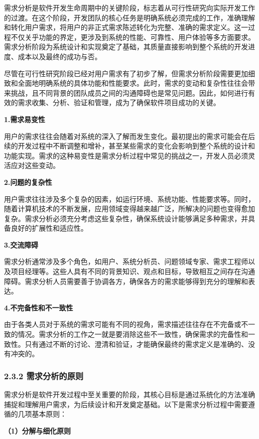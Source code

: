 需求分析是软件开发生命周期中的关键阶段，标志着从可行性研究向实际开发工作的过渡。在这个阶段，开发团队的核心任务是明确系统必须完成的工作，准确理解和转化用户需求，将用户的非正式需求陈述转化为完整、准确的需求定义。这一过程不仅关乎功能的界定，更涉及到系统的性能、可靠性、用户体验等多方面要求。需求分析阶段为系统设计和实现奠定了基础，其质量直接影响到整个系统的开发进度、成本以及最终的成功与否。

尽管在可行性研究阶段已经对用户需求有了初步了解，但需求分析阶段需要更加细致和全面地明确系统的具体功能和性能要求。此时，需求的变动和复杂性往往会带来挑战，且不同背景的团队成员之间的沟通障碍也是常见问题。因此，如何进行有效的需求收集、分析、验证和管理，成为了确保软件项目成功的关键。

\textbf{1.需求易变性}

用户的需求往往会随着对系统的深入了解而发生变化。最初提出的需求可能会在后续的开发过程中不断调整和增补，甚至某些需求的变化会影响到整个系统的设计和功能实现。需求的这种易变性是需求分析过程中常见的挑战之一，开发人员必须灵活应对这些变动。

\textbf{2.问题的复杂性}

用户需求往往涉及多个复杂的因素，如运行环境、系统功能、性能要求等。同时，随着计算机技术的不断发展，应用领域变得越来越广泛，所解决的问题也变得愈加复杂。需求分析必须充分考虑这些复杂性，确保系统设计能够满足多种需求，并具备良好的扩展性和适应性。

\textbf{3.交流障碍}

需求分析通常涉及多个角色，如用户、系统分析员、问题领域专家、需求工程师以及项目经理等。这些人具有不同的背景知识、观点和目标，导致相互之间存在沟通障碍。需求分析人员需要善于协调各方，确保各方的需求能够得到充分的理解和表达。

\textbf{4.不完备性和不一致性}

由于各类人员对于系统的需求可能有不同的视角，需求描述往往存在不完备或不一致的情况。需求分析的工作之一就是要消除这些不一致性，确保需求的完备性和一致性。只有通过不断的讨论、澄清和验证，才能确保最终的需求定义是准确的、没有冲突的。

\subsubsection{2.3.2 需求分析的原则}\label{ux9700ux6c42ux5206ux6790ux7684ux539fux5219}

需求分析是软件开发过程中至关重要的阶段，其核心目标是通过系统化的方法准确捕捉和理解用户需求，为后续设计和开发奠定基础。以下是需求分析过程中需要遵循的几项基本原则：

\textbf{（1）分解与细化原则}

